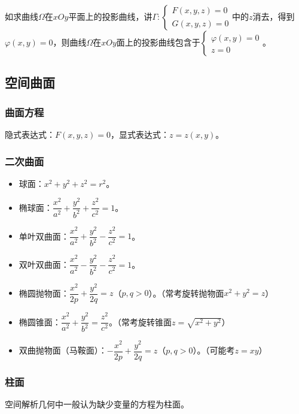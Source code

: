 如求曲线$\varOmega$在$xOy$平面上的投影曲线，讲$\varGamma:\left\{\begin{array}{l}
    F(x,y,z)=0 \\
        G(x,y,z)=0
\end{array}\right.$中的$z$消去，得到$\varphi(x,y)=0$，则曲线$\varOmega$在$xOy$面上的投影曲线包含于$\left\{\begin{array}{l}
    \varphi(x,y)=0 \\
    z=0
\end{array}\right.$。

\subsection{空间曲面}

\subsubsection{曲面方程}

隐式表达式：$F(x,y,z)=0$，显式表达式：$z=z(x,y)$。

\subsubsection{二次曲面}

\begin{itemize}
    \item 球面：$x^2+y^2+z^2=r^2$。
    \item 椭球面：$\dfrac{x^2}{a^2}+\dfrac{y^2}{b^2}+\dfrac{z^2}{c^2}=1$。
    \item 单叶双曲面：$\dfrac{x^2}{a^2}+\dfrac{y^2}{b^2}-\dfrac{z^2}{c^2}=1$。
    \item 双叶双曲面：$\dfrac{x^2}{a^2}-\dfrac{y^2}{b^2}-\dfrac{z^2}{c^2}=1$。
    \item 椭圆抛物面：$\dfrac{x^2}{2p}+\dfrac{y^2}{2q}=z$（$p,q>0$）。（常考旋转抛物面$x^2+y^2=z$）
    \item 椭圆锥面：$\dfrac{x^2}{a^2}+\dfrac{y^2}{b^2}=\dfrac{z^2}{c^2}$。（常考旋转锥面$z=\sqrt{x^2+y^2}$）
    \item 双曲抛物面（马鞍面）：$-\dfrac{x^2}{2p}+\dfrac{y^2}{2q}=z$（$p,q>0$）。（可能考$z=xy$）
\end{itemize}

\subsubsection{柱面}

空间解析几何中一般认为缺少变量的方程为柱面。

